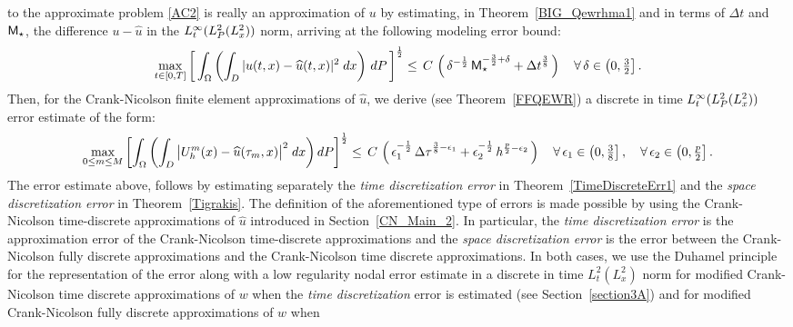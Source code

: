 \documentclass[10pt]{amsart}
\numberwithin{equation}{section}
\begin{document}
to the approximate problem \eqref{AC2} is really an approximation of $u$
by estimating, in Theorem~\ref{BIG_Qewrhma1}
and in terms of ${\Delta t}$ and ${\sf M}_{\star}$, the difference $u-{\widehat u}$
in the $L^{\infty}_t(L^2_{{\scriptscriptstyle} P}(L^2_x))$ norm, arriving at the following
modeling error bound:
\begin{equation*}\label{Model_Error}
\max_{t\in[0,T]}\left[\,\int_{{\scriptscriptstyle}\Omega}\left(\int_{{\scriptscriptstyle}
D}|u(t,x)-{\widehat
u}(t,x)|^2\;dx\right)\,dP\,\right]^{\frac{1}{2}}\leq\,C\,\left(\,\delta^{-{\frac{1}{2}}}
\,{\sf M}_{\star}^{-\frac{3}{2}+\delta}+{\Delta t}^{\frac{3}{8}}\,\right)
\quad\forall\,\delta\in\left(0,\tfrac{3}{2}\right]. 
\end{equation*}
Then, for  the Crank-Nicolson finite element approximations of ${\widehat u}$,
we derive (see Theorem~\ref{FFQEWR})  a discrete in time
$L^{\infty}_t(L^2_{{\scriptscriptstyle} P}(L^2_x))$ error estimate of the form:
\begin{equation*}\label{FDEstim4}
\max_{0\leq{m}\leq{{\scriptscriptstyle} M}}\left[\int_{{\scriptscriptstyle}\Omega}\left( \int_{{\scriptscriptstyle}
D}\big|U_h^m(x)-{\widehat
u}(\tau_m,x)\big|^2\;dx\right)dP\right]^{\frac{1}{2}}\leq\,C\,
\left(\,\epsilon_1^{-{\frac{1}{2}}}\,{\Delta\tau}^{\frac{3}{8}-\epsilon_1}
+\epsilon_2^{-{\frac{1}{2}}}\,h^{\frac{p}{2}-\epsilon_2}\,\right)
\quad\forall\,\epsilon_1\in\left(0,\tfrac{3}{8}\right],
\quad\forall\,\epsilon_2\in\left(0,\tfrac{p}{2}\right].
\end{equation*}
The error estimate above, follows by estimating separately the
{\sl time discretization error} in Theorem~\ref{TimeDiscreteErr1}
and the {\sl space discretization error} in Theorem~\ref{Tigrakis}.
The definition of the aforementioned type of errors is made possible
by using the Crank-Nicolson time-discrete approximations
of ${\widehat u}$ introduced in Section~\ref{CN_Main_2}.
In particular, the {\sl time discretization error} is the approximation error
of the Crank-Nicolson time-discrete approximations and the
{\sl space discretization error} is the error between the Crank-Nicolson
fully discrete approximations and the Crank-Nicolson time discrete approximations.
In both cases, we use the Duhamel principle for the representation of the error
along with a low regularity nodal error estimate in a discrete in time $L^2_t(L^2_x)$
norm for modified Crank-Nicolson time discrete approximations of $w$ when
the {\sl time discretization} error is estimated (see Section~\ref{section3A})
and for modified Crank-Nicolson fully discrete approximations of $w$ when
\end{document}
